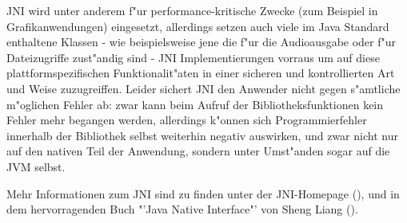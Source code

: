 JNI wird unter anderem f"ur performance-kritische Zwecke (zum Beispiel in Grafikanwendungen) eingesetzt, allerdings setzen auch viele im Java Standard enthaltene
Klassen - wie beispielsweise jene die f"ur die Audioausgabe oder f"ur Dateizugriffe zust"andig sind - JNI Implementierungen vorraus um auf diese
plattformspezifischen Funktionalit"aten in einer sicheren und kontrollierten Art und Weise zuzugreiffen. Leider sichert JNI den Anwender nicht gegen s"amtliche m"oglichen
Fehler ab: zwar kann beim Aufruf der Bibliotheksfunktionen kein Fehler mehr begangen werden, allerdings k"onnen sich Programmierfehler innerhalb der
Bibliothek selbst weiterhin negativ auswirken, und zwar nicht nur auf den nativen Teil der Anwendung, sondern unter Umst"anden sogar auf die JVM selbst.

Mehr Informationen zum JNI sind zu finden unter der JNI-Homepage (\cite{JNIHP}), und in dem hervorragenden Buch "'Java Native Interface"' von Sheng Liang (\cite{JNIBOOK}).


